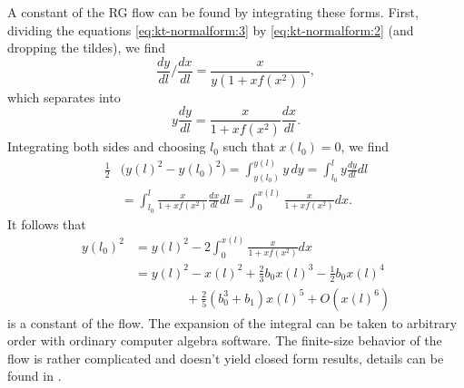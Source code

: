 \documentclass[
 reprint,
 amsmath,amssymb,
 aps, superscriptaddress, pre
]{revtex4-1}
\begin{document}
A constant of the RG flow can be found by integrating these forms. First,
dividing the equations \eqref{eq:kt-normalform:3} by
\eqref{eq:kt-normalform:2} (and dropping the tildes), we find
\begin{equation}
  \frac{dy}{dl}\bigg/\frac{dx}{dl}=\frac x{y(1+xf(x^2))},
\end{equation}
which separates into
\begin{equation}
  y\frac{dy}{dl}=\frac x{1+xf(x^2)}\frac{dx}{dl}.
\end{equation}
Integrating both sides and choosing $l_0$ such that $x(l_0)=0$, we find
\begin{align}
  \frac12&\big(y(l)^2-y(l_0)^2\big)=\int_{y(l_0)}^{y(l)}y\,dy=\int_{l_0}^ly\frac{dy}{dl}dl\\
  &=\int_{l_0}^l\frac x{1+xf(x^2)}\frac{dx}{dl}dl
  =\int_0^{x(l)}\frac x{1+xf(x^2)}dx.
\end{align}
It follows that 
\begin{align}
  y(l_0)^2&=y(l)^2-2\int_0^{x(l)}\frac x{1+xf(x^2)}dx\\
          &=y(l)^2-x(l)^2+\frac23b_0x(l)^3-\frac12b_0x(l)^4\\
          &\hspace{4em}+\frac25(b_0^3+b_1)x(l)^5+O(x(l)^6)
\end{align}
is a constant of the flow. The expansion of the integral can be taken to
arbitrary order with ordinary computer algebra software. The finite-size
behavior of the flow is rather complicated and doesn't yield closed form
results, details can be found in \cite{pelissetto2013renormalization}.
\end{document}
